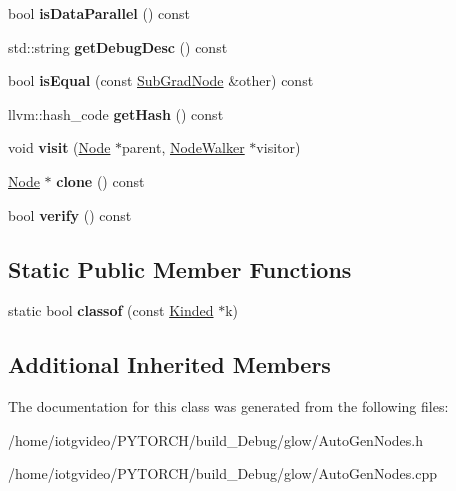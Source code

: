 \begin{DoxyCompactItemize}
bool {\bfseries is\+Data\+Parallel} () const
\item 
\mbox{\label{classglow_1_1_sub_grad_node_a0601b69ff6b892a8a6d86b997a0544d2}} 
std\+::string {\bfseries get\+Debug\+Desc} () const
\item 
\mbox{\label{classglow_1_1_sub_grad_node_a5f2e624355ba2faedf63f8f271ad07c7}} 
bool {\bfseries is\+Equal} (const \hyperlink{classglow_1_1_sub_grad_node}{Sub\+Grad\+Node} \&other) const
\item 
\mbox{\label{classglow_1_1_sub_grad_node_a4787e4ef9716597f06a6298a4fa0457b}} 
llvm\+::hash\+\_\+code {\bfseries get\+Hash} () const
\item 
\mbox{\label{classglow_1_1_sub_grad_node_a19426aa9bd07a4707331a7ecdb50f6e9}} 
void {\bfseries visit} (\hyperlink{classglow_1_1_node}{Node} $\ast$parent, \hyperlink{classglow_1_1_node_walker}{Node\+Walker} $\ast$visitor)
\item 
\mbox{\label{classglow_1_1_sub_grad_node_abe828c47d28a6bd80180bb8f9d1153ac}} 
\hyperlink{classglow_1_1_node}{Node} $\ast$ {\bfseries clone} () const
\item 
\mbox{\label{classglow_1_1_sub_grad_node_afa5b06b0f0a380a2585a7247fc60a027}} 
bool {\bfseries verify} () const
\end{DoxyCompactItemize}
\subsection*{Static Public Member Functions}
\begin{DoxyCompactItemize}
\item 
\mbox{\label{classglow_1_1_sub_grad_node_ac9af2165b1e4131258d12828d99e9cae}} 
static bool {\bfseries classof} (const \hyperlink{classglow_1_1_kinded}{Kinded} $\ast$k)
\end{DoxyCompactItemize}
\subsection*{Additional Inherited Members}


The documentation for this class was generated from the following files\+:\begin{DoxyCompactItemize}
\item 
/home/iotgvideo/\+P\+Y\+T\+O\+R\+C\+H/build\+\_\+\+Debug/glow/Auto\+Gen\+Nodes.\+h\item 
/home/iotgvideo/\+P\+Y\+T\+O\+R\+C\+H/build\+\_\+\+Debug/glow/Auto\+Gen\+Nodes.\+cpp\end{DoxyCompactItemize}
